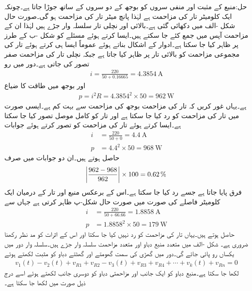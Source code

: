 حل:منبع کے مثبت اور منفی سروں کو بوجھ کے دو سروں کے ساتھ جوڑا جاتا ہے۔چونکہ ایک کلومیٹر تار کی مزاحمت  ہے لہٰذا پانچ میٹر تار کی مزاحمت  ہو گی۔صورت حال شکل -الف میں دکھائی گئی ہے۔بالائی اور نچلی تار سلسلہ وار جڑے ہیں لہٰذا ان کے مزاحمت آپس میں جمع کئے جا سکتے ہیں۔ایسا کرتے ہوئے مسئلے کو شکل  -ب کے طرز پر ظاہر کیا جا سکتا ہے۔ادوار کے اشکال بناتے ہوئے عموماً ایسا ہی کرتے ہوئے تار کی مجموعی مزاحمت کو بالائی تار پر ظاہر کیا جاتا ہے جبکہ نچلی تار کی مزاحمت صفر تصور کی جاتی ہے۔دور میں رو
\begin{align*}
i=\frac{220}{50+0.16665}=\SI{4.3854}{\ampere}
\end{align*}
اور  بوجھ میں طاقت کا ضیاع
\begin{align*}
p=i^2 R=4.3854^2 \times 50=\SI{962}{\watt}
\end{align*}
ہے۔یہاں غور کریں کہ تار کی مزاحمت بوجھ کی مزاحمت سے بہت کم ہے۔ایسی صورت میں تار کی مزاحمت کو رد کیا جا سکتا ہے اور تار کو کامل موصل تصور کیا جا سکتا ہے۔ایسا کرتے ہوئے تار کی مزاحمت کو  تصور کرتے ہوئے جوابات
\begin{align*}
i&=\frac{220}{50+0}=\SI{4.4}{\ampere}\\
p&=4.4^2 \times 50=\SI{968}{\watt}
\end{align*}
حاصل ہوتے ہیں۔ان دو جوابات میں صرف
\begin{align*}
\abs{\frac{962-968}{962}}\times 100=\SI{0.62}{\percent}
\end{align*}
فرق پایا جاتا ہے جسے رد کیا جا سکتا ہے۔اس کے برعکس منبع اور تار کے درمیان ایک کلومیٹر فاصلے کی صورت میں صورت حال شکل-پ ظاہر کرتی ہے جہاں سے
\begin{align*}
i&=\frac{220}{50+66.66}=\SI{1.8858}{\ampere}\\
p&=1.8858^2 \times 50=\SI{179}{\watt}
\end{align*}
حاصل ہوتے ہیں۔یہاں تار کی مزاحمت کو رد نہیں کیا جا سکتا اور اس کے اثرات کو مد نظر رکھنا ضروری ہے۔
شکل -الف میں متعدد منبع دباو اور متعدد مزاحمت سلسلہ وار جڑے ہیں۔سلسلہ وار دور میں یکساں رو  پائی جائے گی۔دور میں گھڑی کی سمت گھومتے اور گھٹتے دباو کو مثبت لکھتے ہوئے
\begin{align}
v_1(t)-v_2(t)+v_{R1}+v_{R2}-v_3(t)+v_{R3}+v_{R4}+\cdots+v_k(t)+v_{Rn}=0
\end{align}
لکھا جا سکتا ہے۔منبع دباو کو ایک جانب اور مزاحمتی دباو کو دوسری جانب لکھتے ہوئے اسے درج ذیل صورت میں لکھا جا سکتا ہے۔
